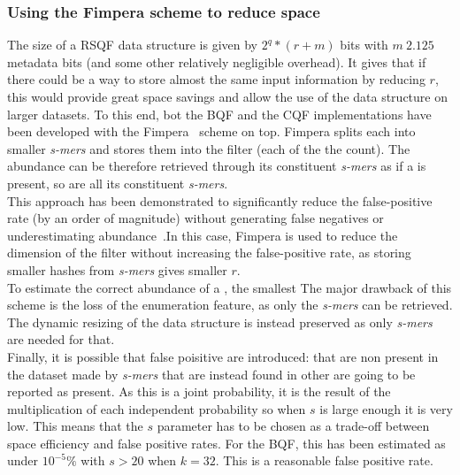 \subsubsection{Using the Fimpera scheme to reduce space}
The size of a RSQF data structure is given by $2^q * (r + m )$ bits with $m~ 2.125$ metadata bits (and some other relatively negligible overhead). It gives that if there could be a way to store almost the same input information by reducing $r$, this would provide great space savings and allow the use of the data structure on larger datasets. To this end, bot the BQF and the CQF implementations have been developed with the Fimpera~\cite{fimpera} scheme on top.
Fimpera splits each \kmer into smaller \emph{s-mers} and stores them into the filter (each of the the \kmer count). The \kmer abundance can be therefore retrieved through its constituent \emph{s-mers} as if a \kmer is present, so are all its constituent \emph{s-mers}.\\
This approach has been demonstrated to significantly reduce the false-positive rate (by an order of magnitude) without generating false negatives or underestimating \kmer abundance~\cite{fimpera}.In this case, Fimpera is used to reduce the dimension of the filter without increasing the false-positive rate, as storing smaller hashes from \emph{s-mers} gives smaller $r$.\\
To estimate the correct abundance of a \kmer, the smallest 
The major drawback of this scheme is the loss of the \kmer enumeration feature, as only the \emph{s-mers} can be retrieved. The dynamic resizing of the data structure is instead preserved as only \emph{s-mers} are needed for that.\\
Finally, it is possible that false poisitive \kmers are introduced: \kmers that are non present in the dataset made by \emph{s-mers} that are instead found in other \kmers are going to be reported as present. As this is a joint probability, it is the result of the multiplication of each independent probability so when $s$ is large enough it is very low. This means that the $s$ parameter has to be chosen as a trade-off between space efficiency and false positive rates. For the BQF, this has been estimated as under $10^{-5}\%$ with $s > 20$ when $k = 32$. This is a reasonable false positive rate.
